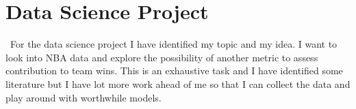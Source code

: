 \documentclass{article}
\begin{document}
\section{Data Science Project}\
For the data science project I have identified my topic and my idea. I want to look into NBA data and explore the possibility of another metric to assess contribution to team wins. This is an exhaustive task and I have identified some literature but I have lot more work ahead of me so that I can collect the data and play around with worthwhile models. 
\end{document}
